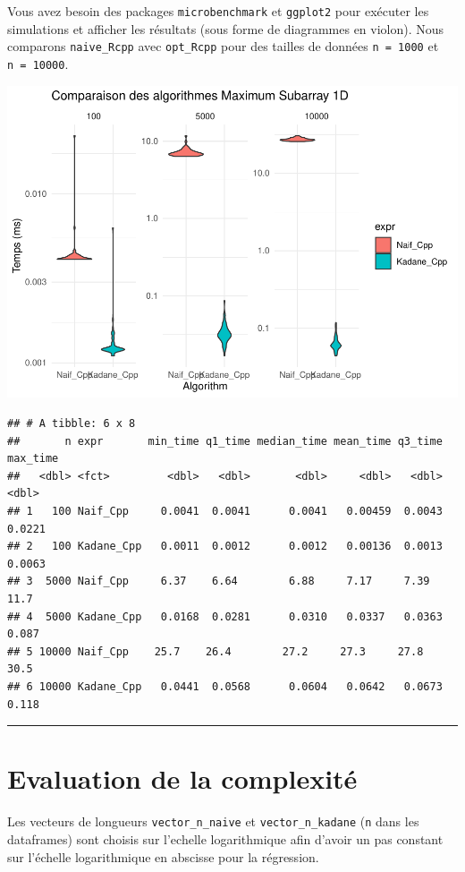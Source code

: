 \documentclass[
]{article}
\begin{document}
Vous avez besoin des packages \texttt{microbenchmark} et
\texttt{ggplot2} pour exécuter les simulations et afficher les résultats
(sous forme de diagrammes en violon). Nous comparons
\texttt{naive\_Rcpp} avec \texttt{opt\_Rcpp} pour des tailles de données
\texttt{n\ =\ 1000} et \texttt{n\ =\ 10000}.

\includegraphics{MaxSubarray1D_files/figure-latex/benchmark-1.pdf}

\begin{verbatim}
## # A tibble: 6 x 8
##       n expr       min_time q1_time median_time mean_time q3_time max_time
##   <dbl> <fct>         <dbl>   <dbl>       <dbl>     <dbl>   <dbl>    <dbl>
## 1   100 Naif_Cpp     0.0041  0.0041      0.0041   0.00459  0.0043   0.0221
## 2   100 Kadane_Cpp   0.0011  0.0012      0.0012   0.00136  0.0013   0.0063
## 3  5000 Naif_Cpp     6.37    6.64        6.88     7.17     7.39    11.7   
## 4  5000 Kadane_Cpp   0.0168  0.0281      0.0310   0.0337   0.0363   0.087 
## 5 10000 Naif_Cpp    25.7    26.4        27.2     27.3     27.8     30.5   
## 6 10000 Kadane_Cpp   0.0441  0.0568      0.0604   0.0642   0.0673   0.118
\end{verbatim}

\begin{center}\rule{0.5\linewidth}{0.5pt}\end{center}

\section{Evaluation de la
complexité}\label{evaluation-de-la-complexituxe9}

Les vecteurs de longueurs \texttt{vector\_n\_naive} et
\texttt{vector\_n\_kadane} (\texttt{n} dans les dataframes) sont choisis
sur l'echelle logarithmique afin d'avoir un pas constant sur l'échelle
logarithmique en abscisse pour la régression.
\end{document}
